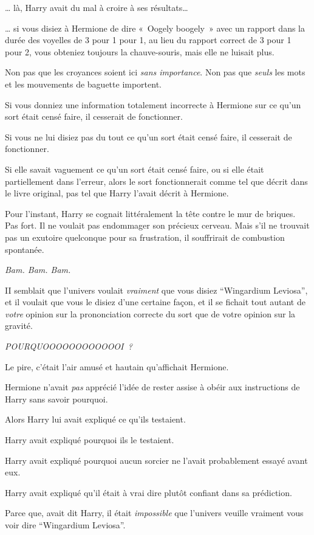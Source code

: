 … là, Harry avait du mal à croire à ses résultats…

… si vous disiez à Hermione de dire «~Oogely boogely~» avec un rapport dans la durée des voyelles de 3 pour 1 pour 1, au lieu du rapport correct de 3 pour 1 pour 2, vous obteniez toujours la chauve-souris, mais elle ne luisait plus.

Non pas que les croyances soient ici \emph{sans importance}. Non pas que \emph{seuls} les mots et les mouvements de baguette importent.

Si vous donniez une information totalement incorrecte à Hermione sur ce qu'un sort était censé faire, il cesserait de fonctionner.

Si vous ne lui disiez pas du tout ce qu'un sort était censé faire, il cesserait de fonctionner.

Si elle savait vaguement ce qu'un sort était censé faire, ou si elle était partiellement dans l'erreur, alors le sort fonctionnerait comme tel que décrit dans le livre original, pas tel que Harry l'avait décrit à Hermione.

Pour l'instant, Harry se cognait littéralement la tête contre le mur de briques. Pas fort. Il ne voulait pas endommager son précieux cerveau. Mais s'il ne trouvait pas un exutoire quelconque pour sa frustration, il souffrirait de combustion spontanée.

\emph{Bam. Bam. Bam.}

II semblait que l'univers voulait \emph{vraiment} que vous disiez “Wingardium Leviosa”, et il voulait que vous le disiez d'une certaine façon, et il se fichait tout autant de \emph{votre} opinion sur la prononciation correcte du sort que de votre opinion sur la gravité.

\emph{POURQUOOOOOOOOOOOOI~?}

Le pire, c'était l'air amusé et hautain qu'affichait Hermione.

Hermione n'avait \emph{pas} apprécié l'idée de rester assise à obéir aux instructions de Harry sans savoir pourquoi.

Alors Harry lui avait expliqué ce qu'ils testaient.

Harry avait expliqué pourquoi ils le testaient.

Harry avait expliqué pourquoi aucun sorcier ne l'avait probablement essayé avant eux.

Harry avait expliqué qu'il était à vrai dire plutôt confiant dans sa prédiction.

Parce que, avait dit Harry, il était \emph{impossible} que l'univers veuille vraiment vous voir dire “Wingardium Leviosa”.

